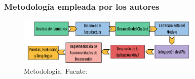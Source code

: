 	\subsubsection{Metodología empleada por los autores}
	\begin{figure}[H]
		\begin{center}
			\includegraphics[width=0.8\textwidth]{2/1_antecedentes/Metodologia-4.png}
			\caption{Metodologia. Fuente: \cite{Medbot-2020} }
		\end{center}
	\end{figure}
	\vspace{-10mm}
